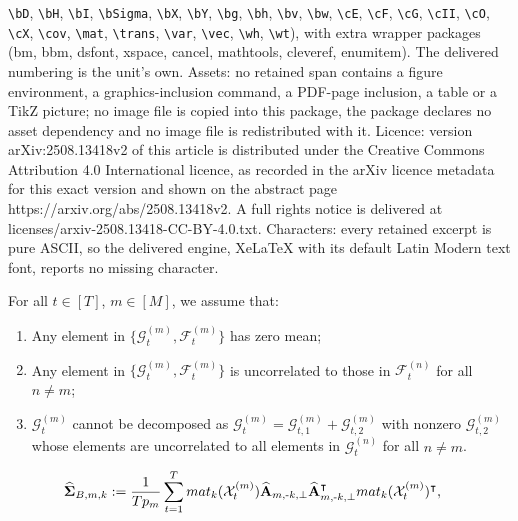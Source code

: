 \documentclass[10pt,a4paper]{amsart}
\def\bA{\mathbf{A}}
\def\bSigma{\boldsymbol{\Sigma}} \def\bOmega{\boldsymbol{\Omega}}
\def\cF{\mathcal{F}}
\def\cG{\mathcal{G}} \def\cH{\boldsymbol{\mathcal{H}}} \def\cI{\mathcal{I}}
\def\cX{\mathcal{X}}
\def\mat{\textnormal{\textsc{mat}}}
\def\trans{\intercal}
\def\wh#1{\widehat{#1}}
\begin{document}
\texttt{\textbackslash bD}, \texttt{\textbackslash bH}, \texttt{\textbackslash bI}, \texttt{\textbackslash bSigma}, \texttt{\textbackslash bX}, \texttt{\textbackslash bY}, \texttt{\textbackslash bg}, \texttt{\textbackslash bh}, \texttt{\textbackslash bv}, \texttt{\textbackslash bw}, \texttt{\textbackslash cE}, \texttt{\textbackslash cF}, \texttt{\textbackslash cG}, \texttt{\textbackslash cII}, \texttt{\textbackslash cO}, \texttt{\textbackslash cX}, \texttt{\textbackslash cov}, \texttt{\textbackslash mat}, \texttt{\textbackslash trans}, \texttt{\textbackslash var}, \texttt{\textbackslash vec}, \texttt{\textbackslash wh}, \texttt{\textbackslash wt}), with extra wrapper packages (bm, bbm, dsfont, xspace, cancel, mathtools, cleveref, enumitem). The delivered numbering is the unit's own. Assets: no retained span contains a figure environment, a graphics-inclusion command, a PDF-page inclusion, a table or a TikZ picture; no image file is copied into this package, the package declares no asset dependency and no image file is redistributed with it. Licence: version arXiv:2508.13418v2 of this article is distributed under the Creative Commons Attribution 4.0 International licence, as recorded in the arXiv licence metadata for this exact version and shown on the abstract page https://arxiv.org/abs/2508.13418v2. A full rights notice is delivered at licenses/arxiv-2508.13418-CC-BY-4.0.txt. Characters: every retained excerpt is pure ASCII, so the delivered engine, XeLaTeX with its default Latin Modern text font, reports no missing character.
\begin{assumption}[Identification]\label{ass: identification}
For all $t\in[T]$, $m\in[M]$, we assume that: 
\begin{enumerate}[itemsep=0pt, label = (\alph*), left = 0pt]
    \item Any element in $\big\{ \cG_t^{(m)}, \cF_t^{(m)} \big\}$ has zero mean;
    \item Any element in $\big\{ \cG_t^{(m)}, \cF_t^{(m)} \big\}$ is uncorrelated to those in $\cF_t^{(n)}$ for all $n\neq m$;
    \item $\cG_t^{(m)}$ cannot be decomposed as $\cG_{t}^{(m)} =\cG_{t,1}^{(m)} + \cG_{t,2}^{(m)}$ with nonzero $\cG_{t,2}^{(m)}$ whose elements are uncorrelated to all elements in $\cG_t^{(n)}$ for all $n\neq m$.
\end{enumerate}
\end{assumption}

\begin{equation}
\label{eqn: def_hat_Sigma_B_mk}
\begin{split}
    \wh\bSigma_{B,m,k} &:= \frac{1}{Tp_m} \sum_{t=1}^T \mat_k(\cX_t^{(m)}) \wh{\bA}_{m,\text{-}k,\perp} \wh{\bA}_{m,\text{-}k,\perp}^\trans \mat_k(\cX_t^{(m)})^\trans ,
\end{split}
\end{equation}
\end{document}
